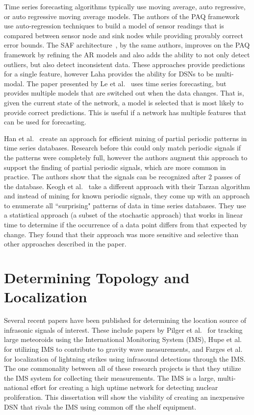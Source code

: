 Time series forecasting algorithms typically use moving average, auto regressive, or auto regressive moving average models. The authors of the PAQ framework~\cite{tulone2006paq} use auto-regression techniques to build a model of sensor readings that is compared between sensor node and sink nodes while  providing provably correct error bounds. The SAF architecture~\cite{tulone2006energy}, by the same authors, improves on the PAQ framework by refining the AR models and also adds the ability to not only detect outliers, but also detect inconsistent data. These approaches provide predictions for a single feature, however Laha provides the ability for DSNs to be multi-modal. The paper presented by Le et al.~\cite{le2007adaptive} uses time series forecasting, but provides multiple models that are switched out when the data changes. That is, given the current state of the network, a model is selected that is most likely to provide correct predictions. This is useful if a network has multiple features that can be used for forecasting.

Han et al.~\cite{han1999efficient} create an approach for efficient mining of partial periodic patterns in time series databases. Research before this could only match periodic signals if the patterns were completely full, however the authors augment this approach to support the finding of partial periodic signals, which are more common in practice. The authors show that the signals can be recognized after 2 passes of the database. Keogh et al.~\cite{keogh2002finding} take a different approach with their Tarzan algorithm and instead of mining for known periodic signals, they come up with an approach to enumerate all ``surprising" patterns of data in time series databases. They use a statistical approach (a subset of the stochastic approach) that works in linear time to determine if the occurrence of a data point differs from that expected by change. They found that their approach was more sensitive and selective than other approaches described in the paper.

\section{Determining Topology and Localization}\label{sec:determining-topology-and-localization}

Several recent papers have been published for determining the location source of infrasonic signals of interest. These include papers by Pilger et al.~\cite{pilger2019large} for tracking large meteoroids using the International Monitoring System (IMS), Hupe et al.~\cite{hupe2019can} for utilizing IMS to contribute to gravity wave measurements, and Farges et al.~\cite{farges2019infrasound} for localization of lightning strikes using infrasound detections through the IMS. The one commonality between all of these research projects is that they utilize the IMS system for collecting their measurements. The IMS is a large, multi-national effort for creating a high uptime network for detecting nuclear proliferation. This dissertation will show the viability of creating an inexpensive DSN that rivals the IMS using common off the shelf equipment.

